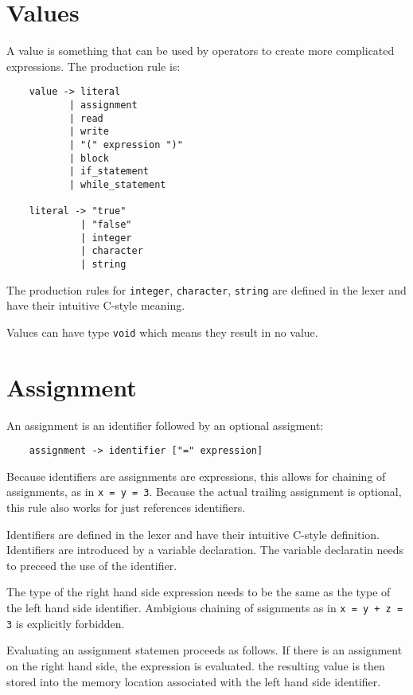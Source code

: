 \documentclass{report}
\begin{document}
\section{Values}

A value is something that can be used by operators to create more
complicated expressions. The production rule is:

\begin{verbatim}
    value -> literal
           | assignment
           | read
           | write
           | "(" expression ")"
           | block
           | if_statement
           | while_statement

    literal -> "true"
             | "false"
             | integer
             | character
             | string
\end{verbatim}

The production rules for \texttt{integer}, \texttt{character},
\texttt{string} are defined in the lexer and have their intuitive
C-style meaning.

Values can have type \texttt{void} which means they result in no
value.

\section{Assignment}

An assignment is an identifier followed by an optional assigment:

\begin{verbatim}
    assignment -> identifier ["=" expression]
\end{verbatim}

Because identifiers are assignments are expressions, this allows for
chaining of assignments, as in \texttt{x = y = 3}. Because the
actual trailing assignment is optional, this rule also works for
just references identifiers.

Identifiers are defined in the lexer and have their intuitive
C-style definition. Identifiers are introduced by a variable
declaration. The variable declaratin needs to preceed the use of the
identifier.

The type of the right hand side expression needs to be the same as
the type of the left hand side identifier. Ambigious chaining of
ssignments as in \texttt{x = y + z = 3} is explicitly forbidden.

Evaluating an assignment statemen proceeds as follows. If there is
an assignment on the right hand side, the expression is evaluated.
the resulting value is then stored into the memory location
associated with the left hand side identifier.
\end{document}
